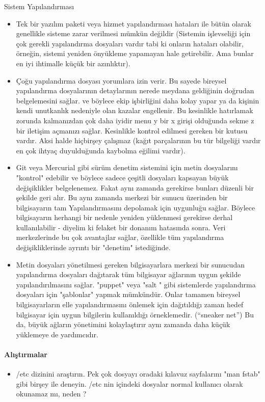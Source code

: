 \begin{section}{Sistem Yapılandırması}
\begin{itemize}
\item Tek bir yazılım paketi veya hizmet yapılandırması hataları ile bütün olarak genellikle sisteme zarar verilmesi mümkün değildir (Sistemin işlevseliği için çok gerekli yapılandırma dosyaları vardır tabi ki onların hataları olabilir, örneğin, sistemi yeniden önyükleme yapamayan hale getirebilir. Ama bunlar en iyi ihtimalle küçük bir azınlıktır).
\item Çoğu yapılandırma dosyası yorumlara izin verir. Bu sayede bireysel yapılandırma dosyalarının detaylarının nerede meydana geldiğinin doğrudan  belgelemesini sağlar. ve böylece ekip işbirliğini daha kolay yapar ya da kişinin kendi unutkanlık nedeniyle olan kazalar engellenir. Bu kesinlikle hatırlamak zorunda kalmanızdan çok daha iyidir menu y bir x girişi olduğunda sekme z bir iletişim açmanızı sağlar. Kesinlikle kontrol edilmesi gereken bir kutusu vardır. Aksi halde hiçbirşey çalışmaz (kağıt parçalarının bu tür bilgeliği vardır en çok ihtyaç duyulduğunda kaybolma eğilimi vardır).
\item Git veya Mercurial gibi sürüm denetim sistemini için metin dosyalarını "kontrol" edebilir ve böylece sadece çeşitli dosyaları kapsayan büyük değişiklikler belgelenemez. Fakat aynı zamanda gerekirse bunları düzenli bir şekilde geri alır. Bu aynı zamanda merkezi bir sunucu üzerinden bir bilgisayarın tam Yapılandırmasını depolamak için  uygunluğu sağlar. Böylece bilgisayarın herhangi bir nedenle yeniden yüklenmesi gerekirse derhal kullanılabilir - diyelim ki felaket bir donanım hatasında sonra. Veri merkezlerinde bu  çok avantajlar sağlar, özellikle tüm yapılandırma değişikliklerinde ayrıntı bir "denetim" istediğinde.
\item Metin dosyaları yönetilmesi gereken bilgisayarlara merkezi bir sunucudan yapılandırma dosyaları dağıtarak tüm bilgisayar ağlarının uygun şekilde yapılandırılmasını sağlar. "puppet" veya "salt " gibi sistemlerde yapılandırma dosyaları için "şablonlar" yapmak mümkündür. Onlar tamamen bireysel bilgisayarların elle yapılandırmasını önlemek için dağıtıldığı zaman hedef bilgisayar için uygun bilgilerin kullanıldığı  örneklemedir. (“sneaker net”) Bu da, büyük ağların yönetimini kolaylaştırır  aynı zamanda daha küçük yüklemeye de yardımcıdır.
\end{itemize}
\paragraph{Alıştırmalar}{
\begin{itemize}
 \item /etc dizinini araştırın. Pek çok dosyayı oradaki kılavuz sayfalarını "man fstab" gibi birşey ile deneyin. /etc nin içindeki dosyalar normal kullanıcı olarak okunamaz mı,  neden ?
\end{itemize}}
\end{section}
